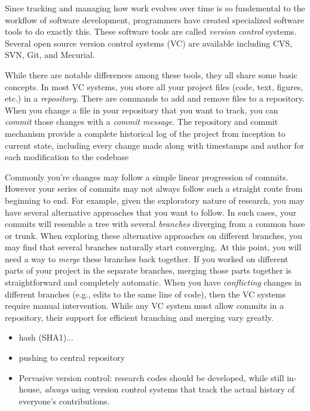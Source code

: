 \documentclass[ChapterTOCs,krantz2]{krantz} %
\begin{document}
Since tracking and managing how work evolves over time is so fundemental to the
workflow of software development, programmers have created specialized software
tools to do exactly this. These software tools are called \emph{version
control} systems. Several open source version control systems (VC) are
available including CVS, SVN, Git, and Mecurial.

While there are notable differences among these tools, they all share some
basic concepts.  In most VC systems, you store all your project files (code,
text, figures, etc.) in a \emph{repository}.  There are commands to add and
remove files to a repository.  When you change a file in your repository that
you want to track, you can \emph{commit} those changes with a \emph{commit
message}.  The repository and commit mechanism provide a complete historical
log of the project from inception to current state, including every change made
along with timestamps and author for each modification to the codebase

Commonly you're changes may follow a simple linear progression of commits.
However your series of commits may not always follow such a straight route from
beginning to end. For example, given the exploratory nature of research, you
may have several alternative approaches that you want to follow. In such cases,
your commits will resemble a tree with several \emph{branches} diverging from a
common base or trunk. When exploring these alternative approaches on different
branches, you may find that several branches naturally start converging. At
this point, you will need a way to \emph{merge} these branches back together.
If you worked on different parts of your project in the separate branches,
merging those parts together is straightforward and completely automatic. When
you have \emph{conflicting} changes in different branches (e.g., edits to the
same line of code), then the VC systems require manual intervention. While any
VC system must allow commits in a repository, their support for efficient
branching and merging vary greatly.

\begin{itemize}

\item hash (SHA1)... 

\item pushing to central repository


\item Pervasive version control: research codes should be developed, while
still in-house, \emph{always} using version control systems that track
the actual history of everyone's contributions.

\end{itemize}
\end{document}
